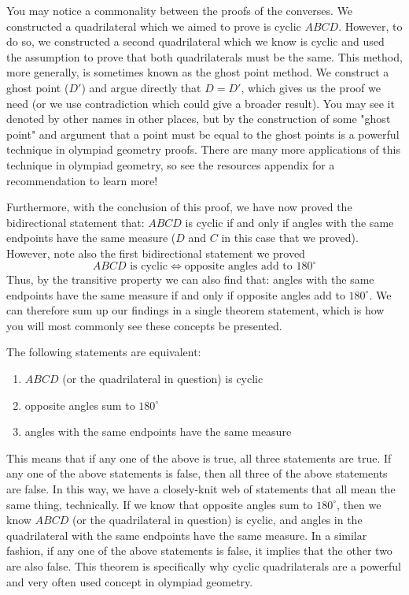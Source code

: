 You may notice a commonality between the proofs of the converses. We constructed a quadrilateral which we aimed to prove is cyclic $ABCD$. However, to do so, we constructed a second quadrilateral which we know is cyclic and used the assumption to prove that both quadrilaterals must be the same. This method, more generally, is sometimes known as the ghost point method. We construct a ghost point ($D'$) and argue directly that $D = D'$, which gives us the proof we need (or we use contradiction which could give a broader result). You may see it denoted by other names in other places, but by the construction of some "ghost point" and argument that a point must be equal to the ghost points is a powerful technique in olympiad geometry proofs. There are many more applications of this technique in olympiad geometry, so see the resources appendix for a recommendation to learn more!

Furthermore, with the conclusion of this proof, we have now proved the bidirectional statement that: $ABCD$ is cyclic if and only if angles with the same endpoints have the same measure
($D$ and $C$ in this case that we proved). However, note also the first bidirectional statement we proved
\[
\text{$ABCD$ is cyclic} \iff \text{opposite angles add to $180^\circ$}
\]
Thus, by the transitive property we can also find that: angles with the same endpoints have the same measure if and only if opposite angles add to $180^\circ$. We can therefore sum up our findings in a single theorem statement, which is how you will most commonly see these concepts be presented.
\begin{theorem}
The following statements are equivalent:
\begin{enumerate}
    \item $ABCD$ (or the quadrilateral in question) is cyclic
    \item opposite angles sum to $180^\circ$
    \item angles with the same endpoints have the same measure
\end{enumerate}
\end{theorem}

This means that if any one of the above is true, all three statements are true. If any one of the above statements is false, then all three of the above statements are false. In this way, we have a closely-knit web of statements that all mean the same thing, technically. If we know that opposite angles sum to $180^\circ$, then we know $ABCD$ (or the quadrilateral in question) is cyclic, and angles in the quadrilateral with the same endpoints have the same measure. In a similar fashion, if any one of the above statements is false, it implies that the other two are also false. This theorem is specifically why cyclic quadrilaterals are a powerful and very often used concept in olympiad geometry. 


